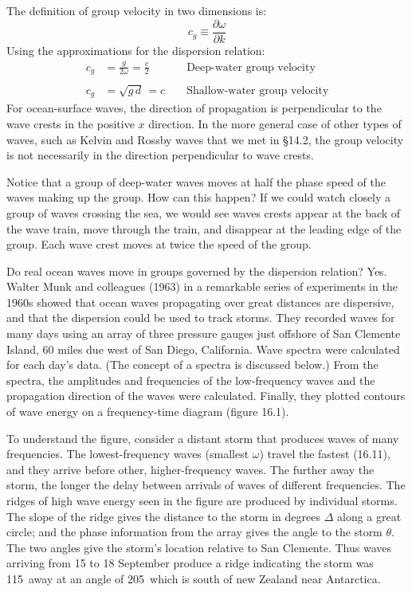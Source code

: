The definition of group velocity in two dimensions is:
\begin{equation}
c_{g} \equiv \frac {\partial \omega }{\partial k}
\end{equation}
Using the approximations for the dispersion relation:
 \begin{align}
 c_{g} &= \frac{g}{2\omega} = \frac{c}{2} & &   \text{ Deep-water group velocity} \\
  & & & \nonumber \\
 c_{g} &= \sqrt{g\,d} \, = c & &   \text{ Shallow-water group velocity}
 \end{align}
For ocean-surface waves, the direction of propagation is perpendicular to the
wave crests in the positive $x$ direction. In the more general case of other
types of waves, such as Kelvin and
Rossby waves that we met in \S14.2, the group velocity
is not necessarily in the direction perpendicular to wave crests.

Notice that a group of deep-water waves moves at half the phase speed of the
waves making up the group. How can this happen? If we could watch closely a
group of waves crossing the sea, we would see waves crests appear at the back of
the wave train, move through the train, and disappear at the leading edge of the
group. Each wave crest moves at twice the speed of the group.

Do real ocean waves move in groups governed by the dispersion relation? Yes.
Walter Munk and colleagues (1963) in a remarkable series of experiments in the
1960s showed that ocean waves propagating over great distances are dispersive, and
that the dispersion could be used to track storms. They recorded waves for many
days using an array of three pressure gauges just offshore of San Clemente
Island, 60 miles due west of San Diego, California. Wave spectra were
calculated for each day's data. (The concept of a spectra is discussed below.) From
the spectra, the amplitudes and frequencies of the low-frequency waves and the
propagation direction of the waves were calculated. Finally, they plotted contours
of wave energy on a frequency-time diagram (figure 16.1).

To understand the figure, consider a distant storm that produces waves of many
frequencies. The lowest-frequency waves (smallest $\omega$) travel the fastest
(16.11), and they arrive before other, higher-frequency waves. The further
away the storm, the longer the delay between arrivals of waves of different
frequencies. The ridges of high wave energy seen in the figure are produced by
individual storms. The slope of the ridge gives the distance to the storm in
degrees $\Delta$ along a great circle; and the phase information from the array
gives the angle to the storm $\theta$. The two angles give the storm's location
relative to San Clemente. Thus waves arriving from 15 to 18 September produce a
ridge indicating the storm was 115\degrees\ away at an angle of 205\degrees\ which
is south of new Zealand near Antarctica. 

